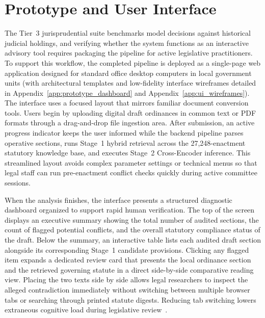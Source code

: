     \section{Prototype and User Interface}
    \label{sec:prototype_development}
    The Tier~3 jurisprudential suite benchmarks model decisions against historical judicial holdings, and verifying whether the system functions as an interactive advisory tool requires packaging the pipeline for active legislative practitioners. To support this workflow, the completed pipeline is deployed as a single-page web application designed for standard office desktop computers in local government units (with architectural templates and low-fidelity interface wireframes detailed in Appendix~\ref{app:prototype_dashboard} and Appendix~\ref{app:ui_wireframes}). The interface uses a focused layout that mirrors familiar document conversion tools. Users begin by uploading digital draft ordinances in common text or PDF formats through a drag-and-drop file ingestion area. After submission, an active progress indicator keeps the user informed while the backend pipeline parses operative sections, runs Stage~1 hybrid retrieval across the 27,248-enactment statutory knowledge base, and executes Stage~2 Cross-Encoder inference. This streamlined layout avoids complex parameter settings or technical menus so that legal staff can run pre-enactment conflict checks quickly during active committee sessions.

    When the analysis finishes, the interface presents a structured diagnostic dashboard organized to support rapid human verification. The top of the screen displays an executive summary showing the total number of audited sections, the count of flagged potential conflicts, and the overall statutory compliance status of the draft. Below the summary, an interactive table lists each audited draft section alongside its corresponding Stage~1 candidate provisions. Clicking any flagged item expands a dedicated review card that presents the local ordinance section and the retrieved governing statute in a direct side-by-side comparative reading view. Placing the two texts side by side allows legal researchers to inspect the alleged contradiction immediately without switching between multiple browser tabs or searching through printed statute digests. Reducing tab switching lowers extraneous cognitive load during legislative review~\cite{sweller1988cognitive}.

